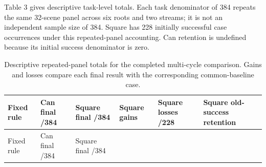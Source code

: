 \documentclass[10pt,letterpaper]{article}
\begin{document}
Table 3 gives descriptive task-level totals. Each task denominator of
384 repeats the same 32-scene panel across six roots and two streams; it
is not an independent sample size of 384. Square has 228 initially
successful case occurrences under this repeated-panel accounting. Can
retention is undefined because its initial success denominator is zero.

\begin{longtable}[]{@{}
  >{\raggedright\arraybackslash}p{}
  >{\raggedleft\arraybackslash}p{}
  >{\raggedleft\arraybackslash}p{}
  >{\raggedleft\arraybackslash}p{}
  >{\raggedleft\arraybackslash}p{}
  >{\raggedleft\arraybackslash}p{}@{}}
\caption{Descriptive repeated-panel totals for the completed multi-cycle
comparison. Gains and losses compare each final result with the
corresponding common-baseline case.}\tabularnewline
\toprule\noalign{}
\begin{minipage}[b]{\linewidth}\raggedright
Fixed rule
\end{minipage} & \begin{minipage}[b]{\linewidth}\raggedleft
Can final /384
\end{minipage} & \begin{minipage}[b]{\linewidth}\raggedleft
Square final /384
\end{minipage} & \begin{minipage}[b]{\linewidth}\raggedleft
Square gains
\end{minipage} & \begin{minipage}[b]{\linewidth}\raggedleft
Square losses /228
\end{minipage} & \begin{minipage}[b]{\linewidth}\raggedleft
Square old-success retention
\end{minipage} \\
\midrule\noalign{}
\endfirsthead
\toprule\noalign{}
\begin{minipage}[b]{\linewidth}\raggedright
Fixed rule
\end{minipage} & \begin{minipage}[b]{\linewidth}\raggedleft
Can final /384
\end{minipage} & \begin{minipage}[b]{\linewidth}\raggedleft
Square final /384
\end{minipage} & \begin{minipage}[b]{\linewidth}\raggedleft

\end{minipage}
\end{longtable}
\end{document}
